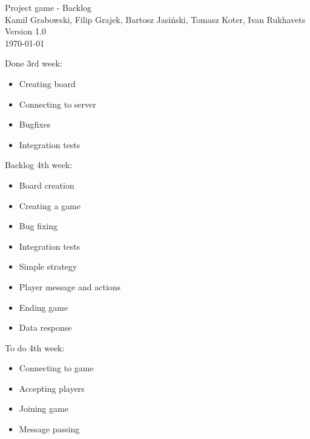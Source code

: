 \documentclass[11pt,a4paper]{article}
\begin{document}
\begin{titlepage}
\centering
\huge Project game - Backlog \\
\vspace{1.5cm}
\large Kamil Grabowski, Filip Grajek, Bartosz Jasiński, Tomasz Koter, Ivan Rukhavets \\
\vspace{1.0cm}
Version 1.0 \\
\vspace{1.0cm}
\today
\end{titlepage}

Done 3rd week:
\begin{itemize}

\item Creating board
\item Connecting to server
\item Bugfixes
\item Integration tests
\end{itemize}


Backlog 4th week:
\begin{itemize}
\item Board creation
\item Creating a game
\item Bug fixing
\item Integration tests
\item Simple strategy
\item Player message and actions
\item Ending game
\item Data response
\end{itemize}


To do 4th week:
\begin{itemize}
\item Connecting to game
\item Accepting players
\item Joining game
\item Message passing
\end{itemize}
 
\end{document}
